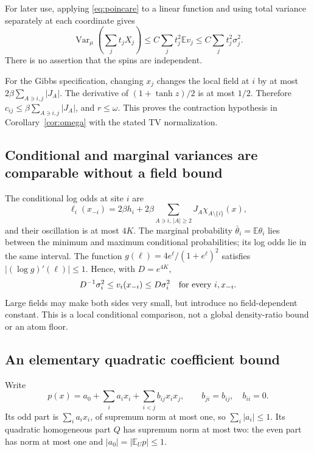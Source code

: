 \documentclass[11pt]{article}
\newcommand{\E}{\mathbb E}
\newcommand{\Var}{\operatorname{Var}}
\begin{document}
For later use, applying \eqref{eq:poincare} to a linear function
and using total variance separately at each coordinate gives
\begin{equation}
 \Var_\mu\left(\sum_jt_jX_j\right)
 \le C\sum_jt_j^2\E v_j
 \le C\sum_jt_j^2\sigma_j^2.
 \label{eq:weighted-cov}
\end{equation}
There is no assertion that the spins are independent.

For the Gibbs specification, changing $x_j$ changes the local
field at $i$ by at most $2\beta\sum_{A\ni i,j}|J_A|$.
The derivative of $(1+\tanh z)/2$ is at most $1/2$. Therefore
$c_{ij}\le\beta\sum_{A\ni i,j}|J_A|$, and $r\le\omega$.
This proves the contraction hypothesis in Corollary~\ref{cor:omega}
with the stated TV normalization.

\subsection{Conditional and marginal variances are comparable without a field bound}

The conditional log odds at site $i$ are
\[
 \ell_i(x_{-i})=2\beta h_i+
              2\beta\sum_{A\ni i,\,|A|\ge2}J_A\chi_{A\setminus\{i\}}(x),
\]
and their oscillation is at most $4K$. The marginal probability
$\bar\theta_i=\E\theta_i$ lies between the minimum and maximum
conditional probabilities; its log odds lie in the same interval.
The function $g(\ell)=4e^\ell/(1+e^\ell)^2$ satisfies
$|(\log g)'(\ell)|\le1$. Hence, with $D=e^{4K}$,
\begin{equation}
 D^{-1}\sigma_i^2\le v_i(x_{-i})\le D\sigma_i^2
 \quad\hbox{for every }i,x_{-i}.
 \label{eq:variance-comparison}
\end{equation}
Large fields may make both sides very small, but introduce no
field-dependent constant. This is a local conditional comparison,
not a global density-ratio bound or an atom floor.

\subsection{An elementary quadratic coefficient bound}

Write
\[
 p(x)=a_0+\sum_i a_ix_i+\sum_{i<j}b_{ij}x_ix_j,
 \qquad b_{ji}=b_{ij},\quad b_{ii}=0.
\]
Its odd part is $\sum_i a_ix_i$, of supremum norm at most one,
so $\sum_i|a_i|\le1$. Its quadratic homogeneous part $Q$ has
supremum norm at most two: the even part has norm at most one and
$|a_0|=|\E_U p|\le1$.
\end{document}
